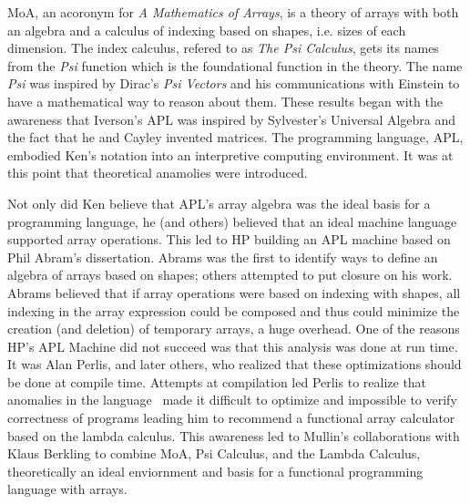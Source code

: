 \newcommand{\cat}{+\!\!\!+}
\newcommand{\Take}{\mbox{Take}}
\newcommand{\take}{\,\bigtriangleup\,}
\newcommand{\Drop}{\mbox{Drop}}
\newcommand{\drop}{\,\bigtriangledown\,}
\newcommand{\rshp}{\,\widehat{\Rho}\;}
\newcommand{\Rho}{\,\rho\,}
\newcommand{\Tau}{\,\tau\,}
\newcommand{\Dim}{\,\delta\,}
\newcommand{\transpose}{\bigcirc\!\!\!\!\!\backslash\;}
\newcommand{\kron}{\bigcirc\,\!\!\!\!\!\!\times\;}
\newcommand{\Ravel}{\,\mbox{\tt rav}\,}
\newcommand{\Gradeup}{\,\mbox{\tt gu}\,}

\newtheorem{definition}{Definition}
\newtheorem{corollary}{Corollary}
\newtheorem{theorem}{Theorem}

\noindent

MoA, an acoronym for {\em A Mathematics of Arrays\cite{thesis}}, is a theory of arrays with both an 
algebra and a calculus of 
indexing based on shapes, i.e. sizes of each dimension. The index calculus, refered to as {\em The Psi Calculus}, 
gets its names from the {\em Psi}  function which is the foundational function in the theory. The name {\em Psi} 
was inspired by Dirac's {\em Psi Vectors} and his communications with Einstein to have a mathematical way to reason
about them. These results began with the awareness that Iverson's APL\cite{iverson62}
was inspired by Sylvester's Universal Algebra\cite{sylvester} and the fact that he and Cayley invented matrices.
The programming language, APL, embodied Ken's notation into an interpretive computing environment. It was at this point
that theoretical anamolies were introduced. 

Not only did  Ken believe that APL's array algebra was the ideal basis for a programming language, he (and others) believed that
an ideal machine language supported array operations. This led to HP building an 
APL machine based on Phil Abram's dissertation\cite{abrams70}. Abrams was the first to identify ways 
to define an algebra of arrays based on shapes; others attempted to
put closure on his work\cite{lyon,guibas}. Abrams believed that if array operations were based on 
indexing with  shapes, all  indexing in the array expression could be  composed
and  thus could minimize the creation (and deletion) of temporary arrays,
a huge overhead. One of the reasons HP's APL Machine did not succeed was that this analysis was done at run time.
It was  Alan Perlis, and later others\cite{miller,budd84},  who realized that these optimizations should be done at compile time. Attempts at compilation led Perlis to realize that  anomalies in the language~\cite{gerhart} 
made it difficult to optimize and impossible to verify correctness of 
programs leading him to recommend a functional array calculator based on the lambda 
calculus\cite{tu2,tu3}. This awareness led to Mullin's collaborations with Klaus Berkling to combine MoA, Psi Calculus, and
the Lambda Calculus, theoretically an ideal enviornment\cite{berkling} and basis for a 
functional programming language with 
arrays\cite{mul91,budd91,hm92,mul93,mul94,mul96}. 



